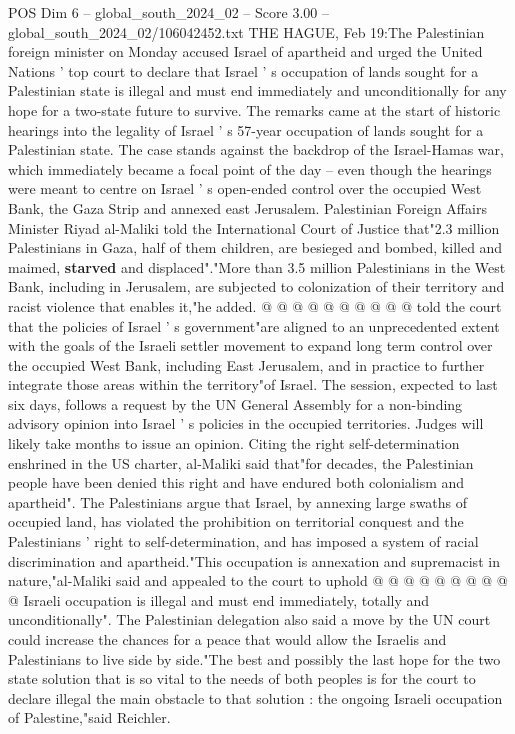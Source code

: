 \begin{textsample}{POS Dim 6 – global\_south\_2024\_02 – Score 3.00 – global\_south\_2024\_02/106042452.txt}  \label{ex:f6_pos_189}
THE HAGUE, Feb 19:The Palestinian foreign minister on Monday accused Israel of apartheid and urged the United Nations ' top court to declare that Israel ' s occupation of lands sought for a Palestinian state is illegal and must end immediately and unconditionally for any hope for a two-state future to survive.
The remarks came at the start of historic hearings into the legality of Israel ' s 57-year occupation of lands sought for a Palestinian state.
The case stands against the backdrop of the Israel-Hamas war, which immediately became a focal point of the day -- even though the hearings were meant to centre on Israel ' s open-ended control over the occupied West Bank, the Gaza Strip and annexed east Jerusalem.
Palestinian Foreign Affairs Minister Riyad al-Maliki told the International Court of Justice that"2.3 million Palestinians in Gaza, half of them children, are besieged and bombed, killed and maimed, \textbf{starved} and displaced"."More than 3.5 million Palestinians in the West Bank, including in Jerusalem, are subjected to colonization of their territory and racist violence that enables it,"he added. @ @ @ @ @ @ @ @ @ @ told the court that the policies of Israel ' s government"are aligned to an unprecedented extent with the goals of the Israeli settler movement to expand long term control over the occupied West Bank, including East Jerusalem, and in practice to further integrate those areas within the territory"of Israel.
The session, expected to last six days, follows a request by the UN General Assembly for a non-binding advisory opinion into Israel ' s policies in the occupied territories.
Judges will likely take months to issue an opinion.
Citing the right self-determination enshrined in the US charter, al-Maliki said that"for decades, the Palestinian people have been denied this right and have endured both colonialism and apartheid".
The Palestinians argue that Israel, by annexing large swaths of occupied land, has violated the prohibition on territorial conquest and the Palestinians ' right to self-determination, and has imposed a system of racial discrimination and apartheid."This occupation is annexation and supremacist in nature,"al-Maliki said and appealed to the court to uphold @ @ @ @ @ @ @ @ @ @ Israeli occupation is illegal and must end immediately, totally and unconditionally".
The Palestinian delegation also said a move by the UN court could increase the chances for a peace that would allow the Israelis and Palestinians to live side by side."The best and possibly the last hope for the two state solution that is so vital to the needs of both peoples is for the court to declare illegal the main obstacle to that solution : the ongoing Israeli occupation of Palestine,"said Reichler.

\end{textsample}

